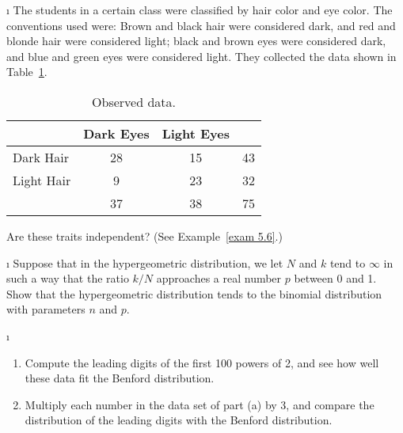 \begin{LJSItem}
\i\label{exer 5.1.25}  The students in a certain class were classified by hair
color and eye color.  The conventions used were:  Brown and black hair were
considered dark, and red and blonde hair were considered light; black and brown
eyes were considered dark, and blue and green eyes were considered light.  They
collected the data shown in Table~\ref{table 5.6}.  
\begin{table}[t]
\centering
\begin{tabular}{|l|c|c|c|}
\hline
 & Dark Eyes & Light Eyes & \\ \hline 
Dark Hair  & 28              & 15 & \hspace{.25in} 43 \hspace{.25in}   \\ \hline 
Light Hair & \hspace{.1in}9  & 23 & \hspace{.25in} 32 \hspace{.25in}   \\ \hline
           & 37              & 38 & \hspace{.25in} 75 \hspace{.25in}   \\ \hline
\end{tabular}
\caption{Observed data.}
\label{table 5.6}
\end{table}
Are these traits independent?  (See Example~\ref{exam 5.6}.)

\i\label{exer 5.1.124}  Suppose that in the hypergeometric distribution, we let
$N$ and $k$ tend to $\infty$ in such a way that the ratio $k/N$ approaches
a real number $p$ between 0 and 1.  Show that the hypergeometric distribution tends to
the binomial distribution with parameters $n$ and $p$.  

\i\label{exer 5.1.126}  
\begin{enumerate}
\item Compute the leading digits of the first 100 powers of 2, and
see how well these data fit the Benford distribution.
\item Multiply each number in the data set of part (a) by 3, and compare
the distribution of the leading digits with the Benford distribution.
\end{enumerate}


\end{LJSItem}
